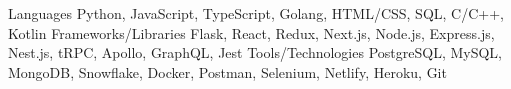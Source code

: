 
\begin{cvskills}
  \cvskill
    {Languages} %
    {Python, JavaScript, TypeScript, Golang, HTML/CSS, SQL, C/C++, Kotlin} %
  \cvskill
    {Frameworks/Libraries} %
    {Flask, React, Redux, Next.js, Node.js, Express.js, Nest.js, tRPC, Apollo, GraphQL, Jest} %
  \cvskill
    {Tools/Technologies} %
    {PostgreSQL, MySQL, MongoDB, Snowflake, Docker, Postman, Selenium, Netlify, Heroku, Git} %
\end{cvskills}
